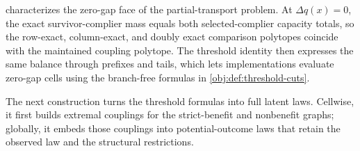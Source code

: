  characterizes the zero-gap face of the partial-transport problem. At \(\Delta q(x)=0\), the exact survivor-complier mass equals both selected-complier capacity totals, so the row-exact, column-exact, and doubly exact comparison polytopes coincide with the maintained coupling polytope. The threshold identity then expresses the same balance through prefixes and tails, which lets implementations evaluate zero-gap cells using the branch-free formulas in \cref{obj:def:threshold-cuts}.

The next construction turns the threshold formulas into full latent laws. Cellwise, it first builds extremal couplings for the strict-benefit and nonbenefit graphs; globally, it embeds those couplings into potential-outcome laws that retain the observed law and the structural restrictions.

